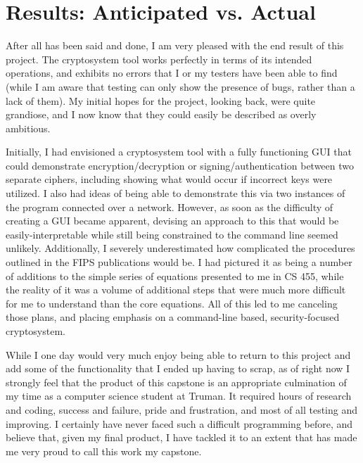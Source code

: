 \documentclass[11pt]{article}
\begin{document}
\section{Results: Anticipated vs. Actual}
After all has been said and done, I am very pleased with the end result of this project. The cryptosystem tool works perfectly in terms of its intended operations, and exhibits no errors that I or my testers have been able to find (while I am aware that testing can only show the presence of bugs, rather than a lack of them). My initial hopes for the project, looking back, were quite grandiose, and I now know that they could easily be described as overly ambitious. 

Initially, I had envisioned a cryptosystem tool with a fully functioning GUI that could demonstrate encryption/decryption or signing/authentication between two separate ciphers, including showing what would occur if incorrect keys were utilized. I also had ideas of being able to demonstrate this via two instances of the program connected over a network. However, as soon as the difficulty of creating a GUI became apparent, devising an approach to this that would be easily-interpretable while still being constrained to the command line seemed unlikely. Additionally, I severely underestimated how complicated the procedures outlined in the FIPS publications would be. I had pictured it as being a number of additions to the simple series of equations presented to me in CS 455, while the reality of it was a volume of additional steps that were much more difficult for me to understand than the core equations. All of this led to me canceling those plans, and placing emphasis on a command-line based, security-focused cryptosystem.

While I one day would very much enjoy being able to return to this project and add some of the functionality that I ended up having to scrap, as of right now I strongly feel that the product of this capstone is an appropriate culmination of my time as a computer science student at Truman. It required hours of research and coding, success and failure, pride and frustration, and most of all testing and improving. I certainly have never faced such a difficult programming before, and believe that, given my final product, I have tackled it to an extent that has made me very proud to call this work my capstone.

\singlespacing


\end{document}
